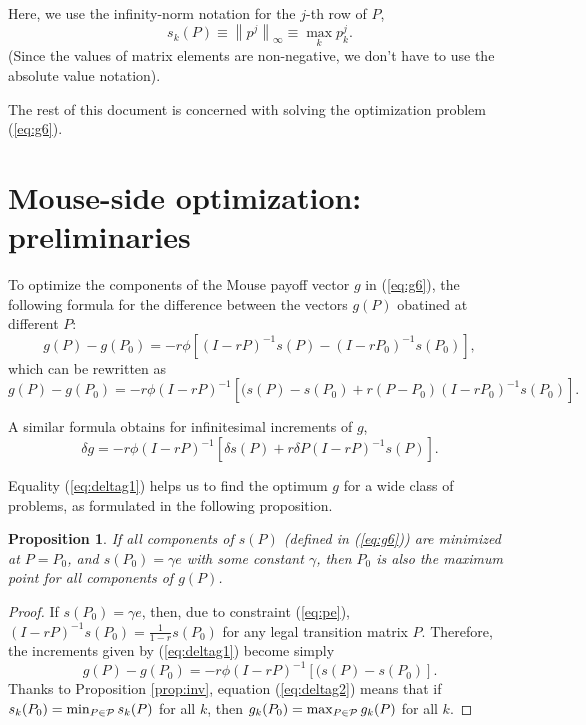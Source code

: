 \documentclass[12pt]{article}
\newcommand{\inorm}[1]{\left\|{#1}\right\|_\infty}
\newtheorem{proposition}{Proposition}
\begin{document}
Here, we use the infinity-norm notation for the $j$-th row of $P$,  
$$s_k(P) \equiv \inorm{p^j} \equiv \max_k p^j_k.
$$
(Since the values of matrix elements are non-negative, we don't have to use the absolute value notation).

The rest of this document is concerned with solving the optimization problem (\ref{eq:g6}).

\section{Mouse-side optimization: preliminaries}
To optimize the components of the Mouse payoff vector $g$ in (\ref{eq:g6}), the following formula for the difference between the vectors $g(P)$ obatined at different $P$:
$$
g(P) - g(P_0) =   - r \phi \left[
 (I - rP)^{-1} s(P) - (I - rP_0)^{-1} s(P_0) \right],
$$
which can be rewritten as
\begin{equation}
\label{eq:deltag1}
g(P) - g(P_0) = - r \phi  (I-rP)^{-1} 
 \left[ (s(P)  - s(P_0)  +  r(P-P_0) (I - rP_0)^{-1}s(P_0)\right].
\end{equation}

A similar formula obtains for infinitesimal increments of $g$,
\begin{equation}
\label{eq:deltag}
\delta g = -r \phi (I-rP)^{-1} 
\left[\delta s(P) + r \delta P  (I-rP)^{-1} s(P)\right].
\end{equation}

Equality (\ref{eq:deltag1}) helps us to find the optimum $g$ for a wide class of problems, as formulated in the following proposition.

\begin{proposition}
\label{prop:p1}
If all components of $s(P)$ (defined in (\ref{eq:g6})) are minimized at $P=P_0$, and $s(P_0) = \gamma e$ with some constant $\gamma$, then $P_0$ is also the maximum point for all components of $g(P)$.
\end{proposition}
\begin{proof}
If $s(P_0) = \gamma e$, then, due to constraint (\ref{eq:pe}),  $(I-rP)^{-1} s(P_0) = \frac{1}{1-r}s(P_0)$ for any legal transition matrix $P$. Therefore, the increments given by (\ref{eq:deltag1}) become simply
\begin{equation}
\label{eq:deltag2}
g(P) - g(P_0) = 
- r \phi  (I - rP)^{-1}  \left[ (s(P)  - s(P_0) \right].
\end{equation}
Thanks to Proposition \ref{prop:inv}, equation (\ref{eq:deltag2}) means that if $s_k(P_0) = \min_{P\in\cal{P}} s_k(P)$ for all $k$, then $g_k(P_0) = \max_{P\in\cal{P}} g_k(P)$ for all $k$.
\end{proof}
\end{document}
